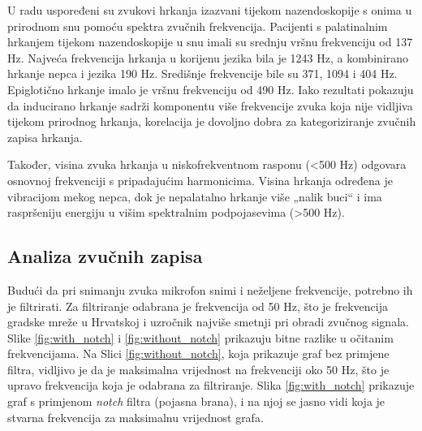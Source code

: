 U radu \cite{bib} uspoređeni su zvukovi hrkanja izazvani tijekom nazendoskopije s onima u prirodnom snu pomoću spektra zvučnih frekvencija. Pacijenti s palatinalnim hrkanjem tijekom nazendoskopije u snu imali su srednju vršnu frekvenciju od 137 Hz. Najveća frekvencija hrkanja u korijenu jezika bila je 1243 Hz, a kombinirano hrkanje nepca i jezika 190 Hz. Središnje frekvencije bile su 371, 1094 i 404 Hz. Epiglotično hrkanje imalo je vršnu frekvenciju od 490 Hz. Iako rezultati pokazuju da inducirano hrkanje sadrži komponentu više frekvencije zvuka koja nije vidljiva tijekom prirodnog hrkanja, korelacija je dovoljno dobra za kategoriziranje zvučnih zapisa hrkanja. 

Također, visina zvuka hrkanja u niskofrekventnom rasponu (<500 Hz) odgovara osnovnoj frekvenciji s pripadajućim harmonicima. Visina hrkanja određena je vibracijom mekog nepca, dok je nepalatalno hrkanje više „nalik buci“ i ima raspršeniju energiju u višim spektralnim podpojasevima (>500 Hz).

\subsection{Analiza zvučnih zapisa}

Budući da pri snimanju zvuka mikrofon snimi i neželjene frekvencije, potrebno ih je filtrirati. Za filtriranje odabrana je frekvencija od 50 Hz, što je frekvencija gradske mreže u Hrvatskoj i uzročnik najviše smetnji pri obradi zvučnog signala. Slike \ref{fig:with_notch} i \ref{fig:without_notch} prikazuju bitne razlike u očitanim frekvencijama. Na Slici \ref{fig:without_notch}, koja prikazuje graf bez primjene filtra, vidljivo je da je maksimalna vrijednost na frekvenciji oko 50 Hz, što je upravo frekvencija koja je odabrana za filtriranje. Slika \ref{fig:with_notch} prikazuje graf s primjenom \textit{notch} filtra (pojasna brana), i na njoj se jasno vidi koja je stvarna frekvencija za maksimalnu vrijednost grafa. 

